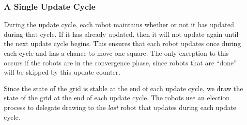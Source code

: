 \documentclass{math}
\begin{document}
\subsubsection*{A Single Update Cycle}
\begin{center}
\end{center}
During the update cycle, each robot maintains whether or not it has updated
during that cycle. If it has already updated, then it will not update again
until the next update cycle begins. This ensures that each robot updates once
during each cycle and has a chance to move one square. The only exception to
this occurs if the robots are in the convergence phase, since robots that are
``done'' will be skipped by this update counter. \par
Since the state of the grid is stable at the end of each update cycle, we draw
the state of the grid at the end of each update cycle. The robots use an
election process to delegate drawing to the \textit{last} robot that updates
during each update cycle.
\end{document}
